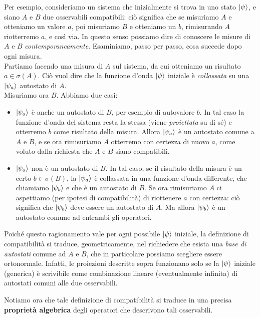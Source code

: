 \documentclass[../../FisicaTeorica.tex]{subfiles}
\begin{document}
\begin{expl}
Per esempio, consideriamo un sistema che inizialmente si trova in uno stato $\Ket{\psi}$, e siano $A$ e $B$ due osservabili compatibili: ciò significa che se misuriamo $A$ e otteniamo un valore $a$, poi misuriamo $B$ e otteniamo un $b$, rimisurando $A$ riotterremo $a$, e così via. In questo senso possiamo dire di conoscere le misure di $A$ e $B$ \textit{contemporaneamente}. Esaminiamo, passo per passo, cosa succede dopo ogni misura.\\

Partiamo facendo una misura di $A$ sul sistema, da cui otteniamo un risultato $a \in \sigma(A)$. Ciò vuol dire che la funzione d'onda $\Ket{\psi}$ iniziale è \textit{collassata} su una $\Ket{\psi_a}$ autostato di $A$.\\
Misuriamo ora $B$. Abbiamo due casi:
\begin{itemize}
\item $\Ket{\psi_a}$ è anche un autostato di $B$, per esempio di autovalore $b$. In tal caso la funzione d'onda del sistema resta la stessa (viene \textit{proiettata} su di sé) e otterremo $b$ come risultato della misura. Allora $\Ket{\psi_a}$ è un autostato comune a $A$ e $B$, e se ora rimisuriamo $A$ otterremo con certezza di nuovo $a$, come voluto dalla richiesta che $A$ e $B$ siano compatibili.
\item $\Ket{\psi_a}$ non è un autostato di $B$. In tal caso, se il risultato della misura è un certo $b\in \sigma(B)$, la $\Ket{\psi_a}$ è collassata in una funzione d'onda differente, che chiamiamo $\Ket{\psi_b}$ e che è un autostato di $B$. Se ora rimisuriamo $A$ ci aspettiamo (per ipotesi di compatibilità) di riottenere $a$ con certezza: ciò significa che $\Ket{\psi_b}$ deve essere un autostato di $A$. Ma allora $\Ket{\psi_b}$ è un autostato comune ad entrambi gli operatori.
\end{itemize}
Poiché questo ragionamento vale per ogni possibile $\Ket{\psi}$ iniziale, la definizione di compatibilità si traduce, geometricamente, nel richiedere che esista una \textit{base di autostati} comune ad $A$ e $B$, che in particolare possiamo scegliere essere ortonormale. Infatti, le proiezioni descritte sopra funzionano solo se la $\Ket{\psi}$ iniziale (generica) è scrivibile come combinazione lineare (eventualmente infinita) di autostati comuni alle due osservabili.
\end{expl}

Notiamo ora che tale definizione di compatibilità si traduce in una precisa \textbf{proprietà algebrica} degli operatori che descrivono tali osservabili.
\end{document}
